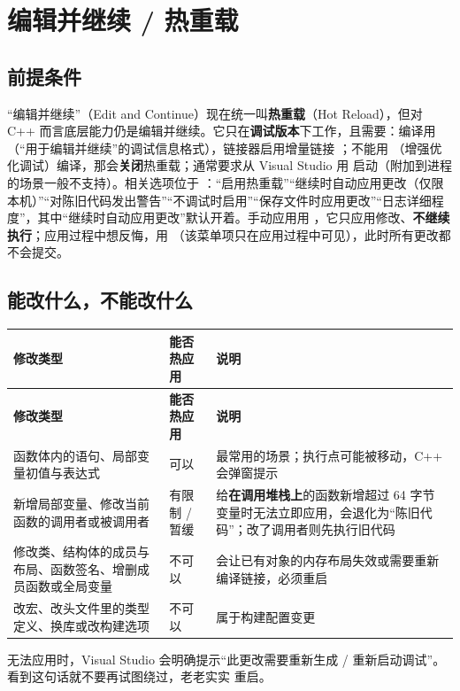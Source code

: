 {\section{编辑并继续 / 热重载}

\subsection{前提条件}

“编辑并继续”（Edit and Continue）现在统一叫\textbf{热重载}（Hot Reload），但对 C++ 而言底层能力仍是编辑并继续。它只在\textbf{调试版本}下工作，且需要：编译用 （“用于编辑并继续”的调试信息格式），链接器启用增量链接 ；不能用 （增强优化调试）编译，那会\textbf{关闭}热重载；通常要求从 Visual Studio 用  启动（附加到进程的场景一般不支持）。相关选项位于 ：“启用热重载”“继续时自动应用更改（仅限本机）”“对陈旧代码发出警告”“不调试时启用”“保存文件时应用更改”“日志详细程度”，其中“继续时自动应用更改”默认开着。手动应用用 ，它只应用修改、\textbf{不继续执行}；应用过程中想反悔，用 （该菜单项只在应用过程中可见），此时所有更改都不会提交。

\subsection{能改什么，不能改什么}

\begin{longtable}{L{4.6cm}L{2.4cm}L{7.6cm}}\toprule
\textbf{修改类型} & \textbf{能否热应用} & \textbf{说明} \\ \midrule \endfirsthead
\toprule \textbf{修改类型} & \textbf{能否热应用} & \textbf{说明} \\ \midrule \endhead \bottomrule \endlastfoot
函数体内的语句、局部变量初值与表达式 & 可以 & 最常用的场景；执行点可能被移动，C++ 会弹窗提示 \\
新增局部变量、修改当前函数的调用者或被调用者 & 有限制 / 暂缓 & 给\textbf{在调用堆栈上}的函数新增超过 64 字节变量时无法立即应用，会退化为“陈旧代码”；改了调用者则先执行旧代码 \\
修改类、结构体的成员与布局、函数签名、增删成员函数或全局变量 & 不可以 & 会让已有对象的内存布局失效或需要重新编译链接，必须重启 \\
改宏、改头文件里的类型定义、换库或改构建选项 & 不可以 & 属于构建配置变更 \\
\end{longtable}
无法应用时，Visual Studio 会明确提示“此更改需要重新生成 / 重新启动调试”。看到这句话就不要再试图绕过，老老实实  重启。

}
